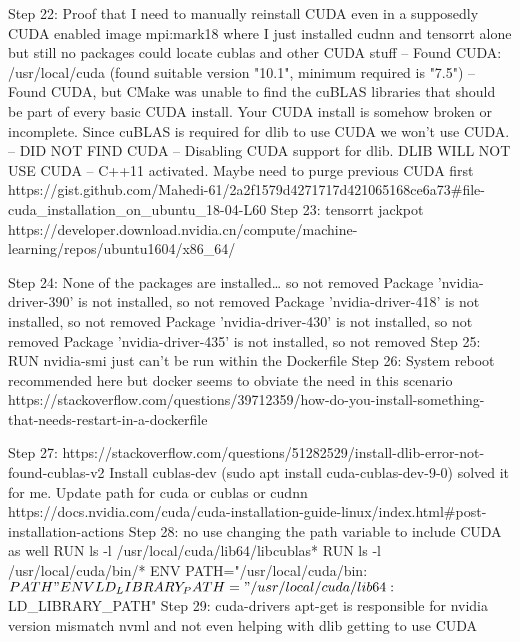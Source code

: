 Step 22: Proof that I need to manually reinstall CUDA even in a supposedly CUDA enabled image
mpi:mark18 where I just installed cudnn and tensorrt alone but still no packages could locate cublas and other CUDA stuff
-- Found CUDA: /usr/local/cuda (found suitable version "10.1", minimum required is "7.5") 
-- Found CUDA, but CMake was unable to find the cuBLAS libraries that should be part of every basic CUDA install. Your CUDA install is somehow broken or incomplete. Since cuBLAS is required for dlib to use CUDA we won't use CUDA.
-- DID NOT FIND CUDA
-- Disabling CUDA support for dlib.  DLIB WILL NOT USE CUDA
-- C++11 activated.
Maybe need to purge previous CUDA first
https://gist.github.com/Mahedi-61/2a2f1579d4271717d421065168ce6a73#file-cuda_installation_on_ubuntu_18-04-L60
Step 23: tensorrt jackpot
https://developer.download.nvidia.cn/compute/machine-learning/repos/ubuntu1604/x86_64/



Step 24: None of the packages are installed… so not removed
Package 'nvidia-driver-390' is not installed, so not removed
Package 'nvidia-driver-418' is not installed, so not removed
Package 'nvidia-driver-430' is not installed, so not removed
Package 'nvidia-driver-435' is not installed, so not removed
Step 25: RUN nvidia-smi just can’t be run within the Dockerfile
Step 26:
System reboot recommended here but docker seems to obviate the need in this scenario
https://stackoverflow.com/questions/39712359/how-do-you-install-something-that-needs-restart-in-a-dockerfile



Step 27: https://stackoverflow.com/questions/51282529/install-dlib-error-not-found-cublas-v2
Install cublas-dev (sudo apt install cuda-cublas-dev-9-0) solved it for me.
Update path for cuda or cublas or cudnn https://docs.nvidia.com/cuda/cuda-installation-guide-linux/index.html#post-installation-actions
Step 28: no use changing the path variable to include CUDA as well
RUN ls -l /usr/local/cuda/lib64/libcublas*
RUN ls -l /usr/local/cuda/bin/*
ENV PATH="/usr/local/cuda/bin:${PATH}"
ENV LD_LIBRARY_PATH="/usr/local/cuda/lib64:${LD_LIBRARY_PATH}"
Step 29: cuda-drivers apt-get is responsible for nvidia version mismatch nvml and not even helping with dlib getting to use CUDA


